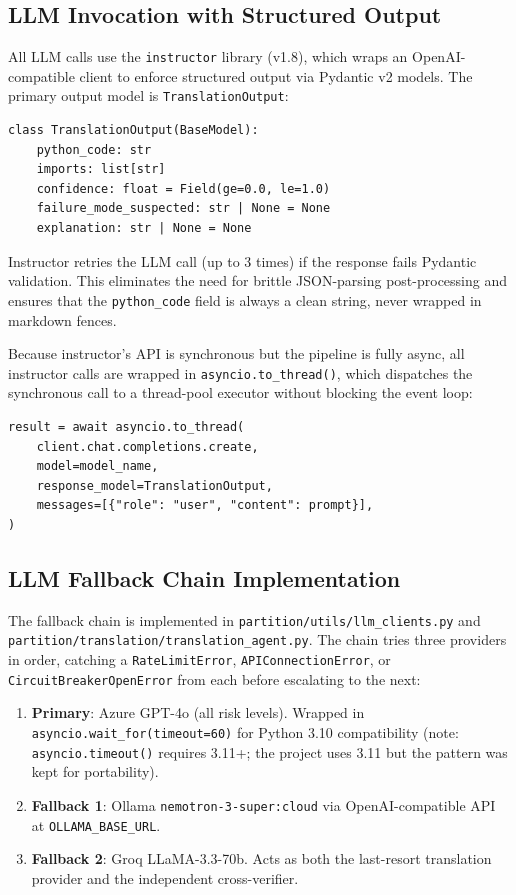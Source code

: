 \subsection{LLM Invocation with Structured Output}
\label{subsec:llm-invocation}

All LLM calls use the \texttt{instructor} library (v1.8), which wraps an
OpenAI-compatible client to enforce structured output via Pydantic v2 models.
The primary output model is \texttt{TranslationOutput}:

\begin{verbatim}
class TranslationOutput(BaseModel):
    python_code: str
    imports: list[str]
    confidence: float = Field(ge=0.0, le=1.0)
    failure_mode_suspected: str | None = None
    explanation: str | None = None
\end{verbatim}

Instructor retries the LLM call (up to 3 times) if the response fails Pydantic
validation. This eliminates the need for brittle JSON-parsing post-processing
and ensures that the \texttt{python\_code} field is always a clean string,
never wrapped in markdown fences.

Because instructor's API is synchronous but the pipeline is fully async,
all instructor calls are wrapped in \texttt{asyncio.to\_thread()}, which
dispatches the synchronous call to a thread-pool executor without blocking
the event loop:

\begin{verbatim}
result = await asyncio.to_thread(
    client.chat.completions.create,
    model=model_name,
    response_model=TranslationOutput,
    messages=[{"role": "user", "content": prompt}],
)
\end{verbatim}

\subsection{LLM Fallback Chain Implementation}
\label{subsec:fallback-impl}

The fallback chain is implemented in \texttt{partition/utils/llm\_clients.py}
and \texttt{partition/translation/translation\_agent.py}. The chain tries three
providers in order, catching a \texttt{RateLimitError}, \texttt{APIConnectionError},
or \texttt{CircuitBreakerOpenError} from each before escalating to the next:

\begin{enumerate}
  \item \textbf{Primary}: Azure GPT-4o (all risk levels). Wrapped in
    \texttt{asyncio.wait\_for(timeout=60)} for Python 3.10 compatibility
    (note: \texttt{asyncio.timeout()} requires 3.11+; the project uses 3.11
    but the pattern was kept for portability).
  \item \textbf{Fallback 1}: Ollama \texttt{nemotron-3-super:cloud} via
    OpenAI-compatible API at \texttt{OLLAMA\_BASE\_URL}.
  \item \textbf{Fallback 2}: Groq LLaMA-3.3-70b. Acts as both the last-resort
    translation provider and the independent cross-verifier.
\end{enumerate}


